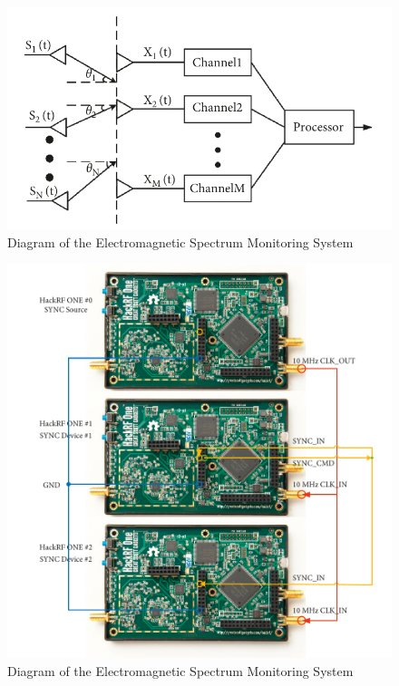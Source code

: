 \documentclass{article}
\begin{document}
\begin{figure}[h!]
    \centering
    \includegraphics[width=\textwidth]{figures/doa2.png}
    \caption{Diagram of the Electromagnetic Spectrum Monitoring System}
    \label{fig:blocks}
\end{figure}

\begin{figure}[h!]
    \centering
    \includegraphics[width=\textwidth]{figures/doa1.png}
    \caption{Diagram of the Electromagnetic Spectrum Monitoring System}
    \label{fig:blocks}
\end{figure}
\end{document}
